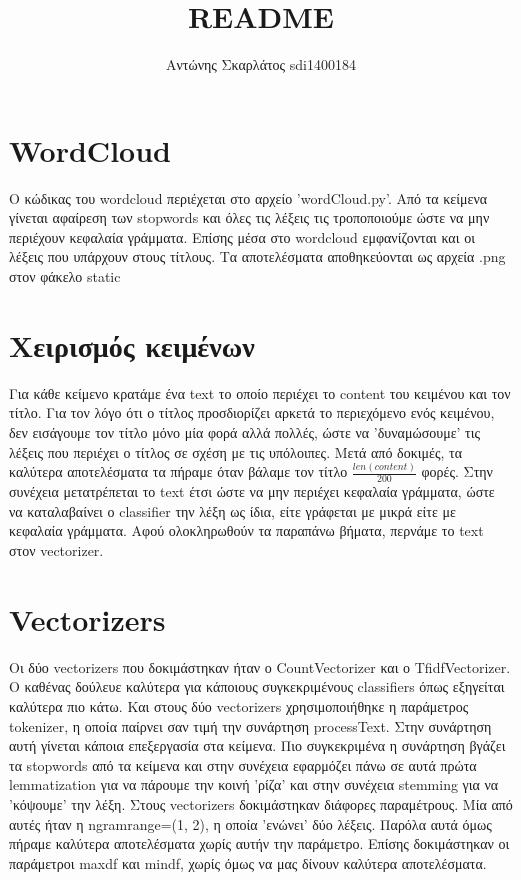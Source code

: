 \documentclass[a4paper,12pt]{article}
\title{README}
\author{Αντώνης Σκαρλάτος sdi1400184}
\date{}
\begin{document}
    \maketitle 
    
    \section*{WordCloud}
        Ο κώδικας του wordcloud περιέχεται στο αρχείο 'wordCloud.py'.
        Από τα κείμενα γίνεται αφαίρεση των stopwords και όλες τις λέξεις τις τροποποιούμε
        ώστε να μην περιέχουν κεφαλαία γράμματα. Επίσης μέσα στο wordcloud εμφανίζονται και οι
        λέξεις που υπάρχουν στους τίτλους. Τα αποτελέσματα αποθηκεύονται ως αρχεία .png στον
        φάκελο static
    
    \section*{Χειρισμός κειμένων}
        Για κάθε κείμενο κρατάμε ένα text το οποίο περιέχει το content του κειμένου και τον τίτλο.
        Για τον λόγο ότι ο τίτλος προσδιορίζει αρκετά το περιεχόμενο ενός κειμένου, δεν εισάγουμε
        τον τίτλο μόνο μία φορά αλλά πολλές, ώστε να 'δυναμώσουμε' τις λέξεις που περιέχει ο τίτλος
        σε σχέση με τις υπόλοιπες. Μετά από δοκιμές, τα καλύτερα αποτελέσματα τα πήραμε όταν βάλαμε
        τον τίτλο $\frac{len(content)}{200}$ φορές. Στην συνέχεια μετατρέπεται το text έτσι ώστε να μην
        περιέχει κεφαλαία γράμματα, ώστε να καταλαβαίνει ο classifier την λέξη ως ίδια, είτε γράφεται
        με μικρά είτε με κεφαλαία γράμματα. Αφού ολοκληρωθούν τα παραπάνω βήματα, περνάμε το text
        στον vectorizer.
    
    \section*{Vectorizers}
        Οι δύο vectorizers που δοκιμάστηκαν ήταν ο CountVectorizer και ο TfidfVectorizer. Ο καθένας
        δούλευε καλύτερα για κάποιους συγκεκριμένους classifiers όπως εξηγείται καλύτερα πιο κάτω.
        Και στους δύο vectorizers χρησιμοποιήθηκε η παράμετρος tokenizer, η οποία παίρνει σαν τιμή
        την συνάρτηση processText. Στην συνάρτηση αυτή γίνεται κάποια επεξεργασία στα κείμενα.
        Πιο συγκεκριμένα η συνάρτηση βγάζει τα stopwords από τα κείμενα και στην συνέχεια εφαρμόζει
        πάνω σε αυτά πρώτα lemmatization για να πάρουμε την κοινή 'ρίζα' και στην συνέχεια stemming
        για να 'κόψουμε' την λέξη. Στους vectorizers δοκιμάστηκαν διάφορες παραμέτρους. Μία από αυτές
        ήταν η ngram\textunderscore range=(1, 2), η οποία 'ενώνει' δύο λέξεις. Παρόλα αυτά όμως
        πήραμε καλύτερα αποτελέσματα χωρίς αυτήν την παράμετρο. Επίσης δοκιμάστηκαν οι παράμετροι
        max\textunderscore df και min\textunderscore df, χωρίς όμως να μας δίνουν καλύτερα
        αποτελέσματα.
    
\end{document}
